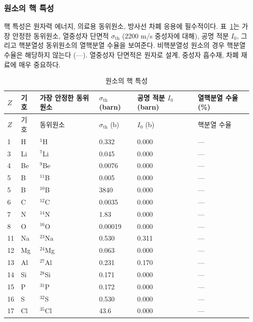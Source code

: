 \documentclass[12pt,a4paper]{article}
\begin{document}
	\subsubsection{원소의 핵 특성}
	\label{subsec:nuclear-properties-func}
	
	핵 특성은 원자력 에너지, 의료용 동위원소, 방사선 차폐 응용에 필수적이다. 표~\ref{tab:nuclear-properties-func}는 가장 안정한 동위원소, 열중성자 단면적 \(\sigma_{\text{th}}\) (2200 m/s 중성자에 대해), 공명 적분 \(I_0\), 그리고 핵분열성 동위원소의 열핵분열 수율을 보여준다. 비핵분열성 원소의 경우 핵분열 수율은 해당하지 않는다 (---). 열중성자 단면적은 원자로 설계, 중성자 흡수재, 차폐 재료에 매우 중요하다.
	
	\begin{longtable}{p{0.8cm}p{1.2cm}p{2.0cm}p{2.5cm}p{2.5cm}p{2.5cm}}
		\caption{원소의 핵 특성} \label{tab:nuclear-properties-func} \\
		\toprule
		\(Z\) & 기호 & 가장 안정한 동위원소 & \(\sigma_{\text{th}}\) (barn) & 공명 적분 \(I_0\) (barn) & 열핵분열 수율 (\%) \\
		\midrule
		\endfirsthead
		\toprule
		\(Z\) & 기호 & 동위원소 & \(\sigma_{\text{th}}\) (b) & \(I_0\) (b) & 핵분열 수율 \\
		\midrule
		\endhead
		1  & H  & \(^{1}\)H & 0.332 & 0.000 & --- \\
		3  & Li & \(^{7}\)Li & 0.045 & 0.000 & --- \\
		4  & Be & \(^{9}\)Be & 0.0076 & 0.000 & --- \\
		5  & B  & \(^{11}\)B & 0.005 & 0.000 & --- \\
		5  & B  & \(^{10}\)B & 3840 & 0.000 & --- \\
		6  & C  & \(^{12}\)C & 0.0035 & 0.000 & --- \\
		7  & N  & \(^{14}\)N & 1.83 & 0.000 & --- \\
		8  & O  & \(^{16}\)O & 0.00019 & 0.000 & --- \\
		11 & Na & \(^{23}\)Na & 0.530 & 0.311 & --- \\
		12 & Mg & \(^{24}\)Mg & 0.063 & 0.000 & --- \\
		13 & Al & \(^{27}\)Al & 0.231 & 0.170 & --- \\
		14 & Si & \(^{28}\)Si & 0.171 & 0.000 & --- \\
		15 & P  & \(^{31}\)P & 0.172 & 0.000 & --- \\
		16 & S  & \(^{32}\)S & 0.530 & 0.000 & --- \\
		17 & Cl & \(^{35}\)Cl & 43.6 & 0.000 & --- \\

\end{longtable}
\end{document}
